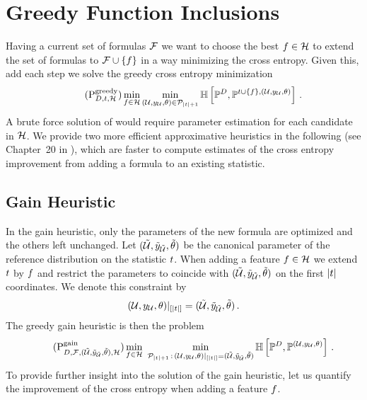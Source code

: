 \section{Greedy Function Inclusions}

Having a current set of formulas $\mathcal{F}$ we want to choose the best $f\in\mathcal{H}$ to extend the set of formulas to $\mathcal{F}\cup\{f\}$ in a way minimizing the cross entropy.
Given this, add each step we solve the greedy cross entropy minimization
\begin{align}
    \label{prob:perfectGreedy}\tag{$\probtagtypeinst{\greedysymbol}{\datamap,\hlnstat,\greedyhypothesis}$}
    \min_{\formula\in\greedyhypothesis} \min_{\hybridparam\in\hybridparamsetofdim{\cardof{\hlnstat}+1}}
    \centropyof{\empdistribution}{\probof{\hlnstat\cup\{\formula\},\hybridparam}} \, .
\end{align}
A brute force solution of  would require parameter estimation for each candidate in $\mathcal{H}$.
We provide two more efficient approximative heuristics in the following (see Chapter~20 in \cite{koller_probabilistic_2009}), which are faster to compute estimates of the cross entropy improvement from adding a formula to an existing statistic.

\subsection{Gain Heuristic}

In the gain heuristic, only the parameters of the new formula are optimized and the others left unchanged.
Let $(\tilde{\mathcal{U}},\tilde{y}_{\tilde{\mathcal{U}}},\tilde{\theta})$ be the canonical parameter of the reference distribution on the statistic $t$.
When adding a feature $f\in\mathcal{H}$ we extend $t$ by $f$ and restrict the parameters to coincide with $(\tilde{\mathcal{U}},\tilde{y}_{\tilde{\mathcal{U}}},\tilde{\theta})$ on the first $\left|t\right|$ coordinates.
We denote this constraint by
\begin{align*}
    {(\mathcal{U},y_{\mathcal{U}},\theta)}|_{[\left|t\right|]} = (\tilde{\mathcal{U}},\tilde{y}_{\tilde{\mathcal{U}}},\tilde{\theta}) \, .
\end{align*}
The greedy gain heuristic is then the problem
\begin{align}
    \label{prob:greedyGain}\tag{$\probtagtypeinst{\gainsymbol}{\datamap,\formulaset,\sechybridparam,\greedyhypothesis}$}
    \min_{\formula\in\greedyhypothesis} \,\, \min_{\hybridparamsetofdim{\cardof{\hlnstat}+1} \wcols \restrictionofto{\hybridparam}{[\cardof{\hlnstat}]} = \sechybridparam }
    \centropyof{\empdistribution}{\probof{\hybridparam}} \, .
\end{align}
To provide further insight into the solution of the gain heuristic, let us quantify the improvement of the cross entropy when adding a feature $f$.

